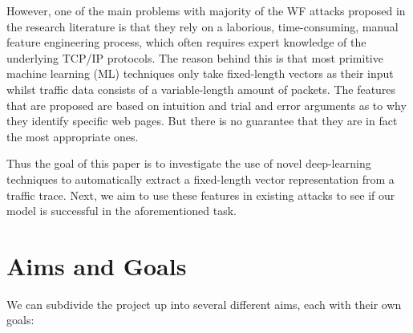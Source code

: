 However, one of the main problems with majority of the WF attacks proposed in the research literature is that they rely on a laborious,
time-consuming, manual feature engineering process, which often requires expert knowledge of the underlying TCP/IP protocols.
The reason behind this is that most primitive machine learning (ML) techniques only take fixed-length vectors as their input whilst traffic data consists of a variable-length amount of packets.
The features that are proposed are based on intuition and trial and error arguments as to why they identify specific web pages.
But there is no guarantee that they are in fact the most appropriate ones.

Thus the goal of this paper is to investigate the use of novel deep-learning techniques to automatically extract
a fixed-length vector representation from a traffic trace.
Next, we aim to use these features in existing attacks to see if our model is successful in the aforementioned task.

\newpage

\section{Aims and Goals}

We can subdivide the project up into several different aims, each with their own goals:


